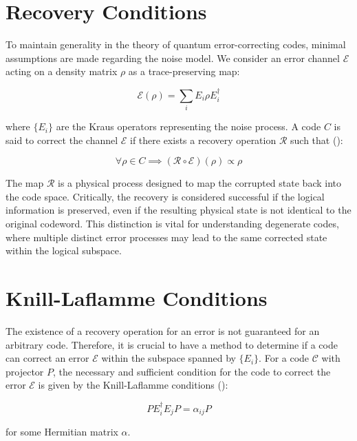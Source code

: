 \section{Recovery Conditions}

To maintain generality in the theory of quantum error-correcting codes, minimal assumptions are made regarding the noise model. We consider an error channel $\mathcal{E}$ acting on a density matrix $\rho$ as a trace-preserving map:

\begin{equation}
\mathcal{E}(\rho) = \sum_{i} E_i \rho E_i^\dagger
\end{equation}

where $\{E_i\}$ are the Kraus operators representing the noise process. A code $C$ is said to correct the channel $\mathcal{E}$ if there exists a recovery operation $\mathcal{R}$ such that (\cite{Nielsen2010}):

\begin{equation}
\forall \rho \in C \implies (\mathcal{R} \circ \mathcal{E})(\rho) \propto \rho
\end{equation}

The map $\mathcal{R}$ is a physical process designed to map the corrupted state back into the code space. Critically, the recovery is considered successful if the logical information is preserved, even if the resulting physical state is not identical to the original codeword. This distinction is vital for understanding degenerate codes, where multiple distinct error processes may lead to the same corrected state within the logical subspace.

\section{Knill-Laflamme Conditions}

The existence of a recovery operation for an error is not guaranteed for an arbitrary code. Therefore, it is crucial to have a method to determine if a code can correct an error $\mathcal{E}$ within the subspace spanned by $\{E_i\}$. For a code $\mathcal{C}$ with projector $P$, the necessary and sufficient condition for the code to correct the error $\mathcal{E}$ is given by the Knill-Laflamme conditions (\cite{Nielsen2010}):

\begin{equation}
P E^\dagger_i E_j P = \alpha_{ij} P
\end{equation}

for some Hermitian matrix $\alpha$.

